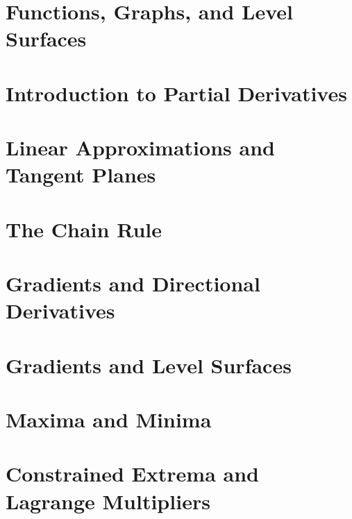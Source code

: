 \documentclass[a4paper, 11pt]{article}
\begin{document}
\section{Functions, Graphs, and Level Surfaces}


\section{Introduction to Partial Derivatives}


\section{Linear Approximations and Tangent Planes}


\section{The Chain Rule}


\section{Gradients and Directional Derivatives}


\section{Gradients and Level Surfaces}


\section{Maxima and Minima}


\section{Constrained Extrema and Lagrange Multipliers}

\end{document}
